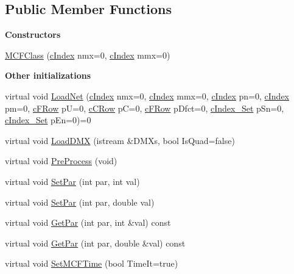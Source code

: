 \subsection*{Public Member Functions}
\begin{Indent}\textbf{ Constructors}\par
\begin{DoxyCompactItemize}
\item 
\mbox{\hyperlink{class_m_c_f_class_ac598fb1a423b3b722414a53c8549953c}{M\+C\+F\+Class}} (\mbox{\hyperlink{class_m_c_f_class_a76aaabb20535c51a2752b93f6c38fe54}{c\+Index}} nmx=0, \mbox{\hyperlink{class_m_c_f_class_a76aaabb20535c51a2752b93f6c38fe54}{c\+Index}} mmx=0)
\end{DoxyCompactItemize}
\end{Indent}
\begin{Indent}\textbf{ Other initializations}\par
\begin{DoxyCompactItemize}
\item 
virtual void \mbox{\hyperlink{class_m_c_f_class_a8d82d26f7845eb69081c860e14c3dc4c}{Load\+Net}} (\mbox{\hyperlink{class_m_c_f_class_a76aaabb20535c51a2752b93f6c38fe54}{c\+Index}} nmx=0, \mbox{\hyperlink{class_m_c_f_class_a76aaabb20535c51a2752b93f6c38fe54}{c\+Index}} mmx=0, \mbox{\hyperlink{class_m_c_f_class_a76aaabb20535c51a2752b93f6c38fe54}{c\+Index}} pn=0, \mbox{\hyperlink{class_m_c_f_class_a76aaabb20535c51a2752b93f6c38fe54}{c\+Index}} pm=0, \mbox{\hyperlink{class_m_c_f_class_ad325f3193dbba0ddef1da4e72d29eda6}{c\+F\+Row}} pU=0, \mbox{\hyperlink{class_m_c_f_class_ab700102e9ba8bb6015be6818d4e99097}{c\+C\+Row}} pC=0, \mbox{\hyperlink{class_m_c_f_class_ad325f3193dbba0ddef1da4e72d29eda6}{c\+F\+Row}} p\+Dfct=0, \mbox{\hyperlink{class_m_c_f_class_a81575b2d4e4d5636b17170432150ae69}{c\+Index\+\_\+\+Set}} p\+Sn=0, \mbox{\hyperlink{class_m_c_f_class_a81575b2d4e4d5636b17170432150ae69}{c\+Index\+\_\+\+Set}} p\+En=0)=0
\item 
virtual void \mbox{\hyperlink{class_m_c_f_class_a34d79a2f00cf8a2416b2b3e41552e843}{Load\+D\+MX}} (istream \&D\+M\+Xs, bool Is\+Quad=false)
\item 
virtual void \mbox{\hyperlink{class_m_c_f_class_a0554708d9abb0e079a8d6f073def9bab}{Pre\+Process}} (void)
\item 
virtual void \mbox{\hyperlink{class_m_c_f_class_ab8e162715d8454f30679c10372db4db8}{Set\+Par}} (int par, int val)
\item 
virtual void \mbox{\hyperlink{class_m_c_f_class_a4acd81f913880873c577de03a4fa1959}{Set\+Par}} (int par, double val)
\item 
virtual void \mbox{\hyperlink{class_m_c_f_class_ac66ea95b63fe61ce67e0f8544f200887}{Get\+Par}} (int par, int \&val) const
\item 
virtual void \mbox{\hyperlink{class_m_c_f_class_a677caf4176eef1509a0fdf87c0662897}{Get\+Par}} (int par, double \&val) const
\item 
virtual void \mbox{\hyperlink{class_m_c_f_class_a5441232979a0ac98410d765b04830eeb}{Set\+M\+C\+F\+Time}} (bool Time\+It=true)
\end{DoxyCompactItemize}
\end{Indent}
